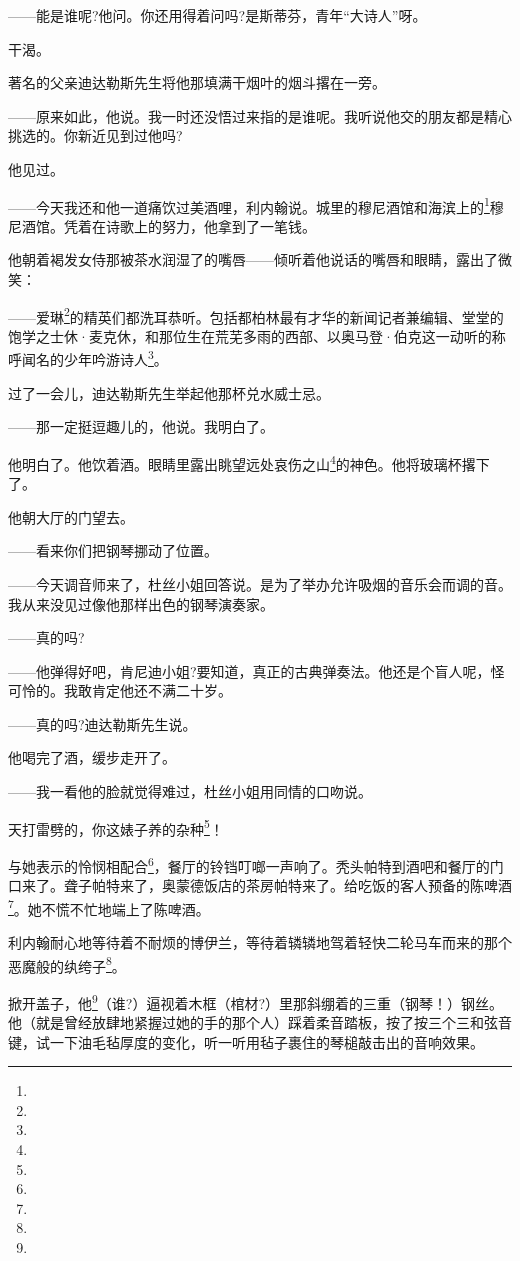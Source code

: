 \par ——能是谁呢?他问。你还用得着问吗?是斯蒂芬，青年“大诗人”呀。
\par 干渴。
\par 著名的父亲迪达勒斯先生将他那填满干烟叶的烟斗撂在一旁。
\par ——原来如此，他说。我一时还没悟过来指的是谁呢。我听说他交的朋友都是精心挑选的。你新近见到过他吗?
\par 他见过。
\par ——今天我还和他一道痛饮过美酒哩，利内翰说。城里的穆尼酒馆和海滨上的\footnote{}穆尼酒馆。凭着在诗歌上的努力，他拿到了一笔钱。
\par 他朝着褐发女侍那被茶水润湿了的嘴唇——倾听着他说话的嘴唇和眼睛，露出了微笑：
\par ——爱琳\footnote{}的精英们都洗耳恭听。包括都柏林最有才华的新闻记者兼编辑、堂堂的饱学之士休·麦克休，和那位生在荒芜多雨的西部、以奥马登·伯克这一动听的称呼闻名的少年吟游诗人\footnote{}。
\par 过了一会儿，迪达勒斯先生举起他那杯兑水威士忌。
\par ——那一定挺逗趣儿的，他说。我明白了。
\par 他明白了。他饮着酒。眼睛里露出眺望远处哀伤之山\footnote{}的神色。他将玻璃杯撂下了。
\par 他朝大厅的门望去。
\par ——看来你们把钢琴挪动了位置。
\par ——今天调音师来了，杜丝小姐回答说。是为了举办允许吸烟的音乐会而调的音。我从来没见过像他那样出色的钢琴演奏家。
\par ——真的吗?
\par ——他弹得好吧，肯尼迪小姐?要知道，真正的古典弹奏法。他还是个盲人呢，怪可怜的。我敢肯定他还不满二十岁。
\par ——真的吗?迪达勒斯先生说。
\par 他喝完了酒，缓步走开了。
\par ——我一看他的脸就觉得难过，杜丝小姐用同情的口吻说。
\par 天打雷劈的，你这婊子养的杂种\footnote{}！
\par 与她表示的怜悯相配合\footnote{}，餐厅的铃铛叮啷一声响了。秃头帕特到酒吧和餐厅的门口来了。聋子帕特来了，奥蒙德饭店的茶房帕特来了。给吃饭的客人预备的陈啤酒\footnote{}。她不慌不忙地端上了陈啤酒。
\par 利内翰耐心地等待着不耐烦的博伊兰，等待着辚辚地驾着轻快二轮马车而来的那个恶魔般的纨绔子\footnote{}。
\par 掀开盖子，他\footnote{}（谁?）逼视着木框（棺材?）里那斜绷着的三重（钢琴！）钢丝。他（就是曾经放肆地紧握过她的手的那个人）踩着柔音踏板，按了按三个三和弦音键，试一下油毛毡厚度的变化，听一听用毡子裹住的琴槌敲击出的音响效果。
